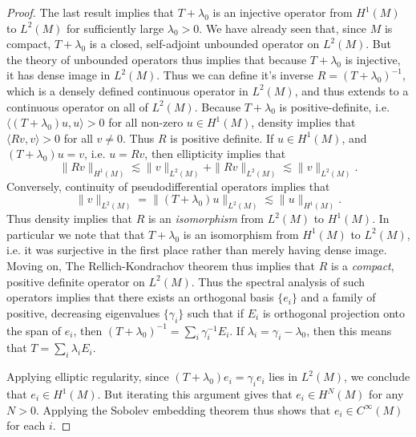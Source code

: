 \begin{proof}
    The last result implies that $T + \lambda_0$ is an injective operator from $H^1(M)$ to $L^2(M)$ for sufficiently large $\lambda_0 > 0$. We have already seen that, since $M$ is compact, $T + \lambda_0$ is a closed, self-adjoint unbounded operator on $L^2(M)$. But the theory of unbounded operators thus implies that because $T + \lambda_0$ is injective, it has dense image in $L^2(M)$. Thus we can define it's inverse $R = (T + \lambda_0)^{-1}$, which is a densely defined continuous operator in $L^2(M)$, and thus extends to a continuous operator on all of $L^2(M)$. Because $T + \lambda_0$ is positive-definite, i.e. $\langle (T + \lambda_0) u, u \rangle > 0$ for all non-zero $u \in H^1(M)$, density implies that $\langle Rv, v \rangle > 0$ for all $v \neq 0$. Thus $R$ is positive definite. If $u \in H^1(M)$, and $(T + \lambda_0) u = v$, i.e. $u = Rv$, then ellipticity implies that
    \[ \| Rv \|_{H^1(M)} \lesssim \| v \|_{L^2(M)} + \| Rv \|_{L^2(M)} \lesssim \| v \|_{L^2(M)}. \]
    Conversely, continuity of pseudodifferential operators implies that
    \[ \| v \|_{L^2(M)} = \| (T + \lambda_0) u \|_{L^2(M)} \lesssim \| u \|_{H^1(M)}. \]
    Thus density implies that $R$ is an \emph{isomorphism} from $L^2(M)$ to $H^1(M)$. In particular we note that that $T + \lambda_0$ is an isomorphism from $H^1(M)$ to $L^2(M)$, i.e. it was surjective in the first place rather than merely having dense image. Moving on, The Rellich-Kondrachov theorem thus implies that $R$ is a \emph{compact}, positive definite operator on $L^2(M)$. Thus the spectral analysis of such operators implies that there exists an orthogonal basis $\{ e_i \}$ and a family of positive, decreasing eigenvalues $\{ \gamma_i \}$ such that if $E_i$ is orthogonal projection onto the span of $e_i$, then $(T + \lambda_0)^{-1} = \sum_i \gamma_i^{-1} E_i$. If $\lambda_i = \gamma_i - \lambda_0$, then this means that $T = \sum_i \lambda_i E_i$. 

    Applying elliptic regularity, since $(T + \lambda_0) e_i = \gamma_i e_i$ lies in $L^2(M)$, we conclude that $e_i \in H^1(M)$. But iterating this argument gives that $e_i \in H^N(M)$ for any $N > 0$. Applying the Sobolev embedding theorem thus shows that $e_i \in C^\infty(M)$ for each $i$.


\end{proof}
